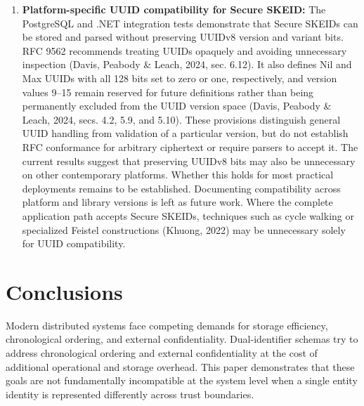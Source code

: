 \documentclass[fleqn,10pt]{wlpeerj}
\begin{document}
\begin{enumerate}
  release, containing algorithms, CDDL definitions, and test vectors.
  Formal IETF submission remains a separate dissemination step.
  Independent implementations in other languages would test the draft's
  interoperability through shared test vectors. Alternative bit
  allocations would require explicit trade-offs among timestamp
  precision, epoch duration, topology capacity, and sequence capacity,
  together with compatibility rules and validation.
\item
  \textbf{Platform-specific UUID compatibility for Secure SKEID:} The
  PostgreSQL and .NET integration tests demonstrate that Secure SKEIDs
  can be stored and parsed without preserving UUIDv8 version and variant
  bits. RFC 9562 recommends treating UUIDs opaquely and avoiding
  unnecessary inspection (Davis, Peabody \& Leach, 2024, sec. 6.12). It
  also defines Nil and Max UUIDs with all 128 bits set to zero or one,
  respectively, and version values 9--15 remain reserved for future
  definitions rather than being permanently excluded from the UUID
  version space (Davis, Peabody \& Leach, 2024, secs. 4.2, 5.9, and
  5.10). These provisions distinguish general UUID handling from
  validation of a particular version, but do not establish RFC
  conformance for arbitrary ciphertext or require parsers to accept it.
  The current results suggest that preserving UUIDv8 bits may also be
  unnecessary on other contemporary platforms. Whether this holds for
  most practical deployments remains to be established. Documenting
  compatibility across platform and library versions is left as future
  work. Where the complete application path accepts Secure SKEIDs,
  techniques such as cycle walking or specialized Feistel constructions
  (Khuong, 2022) may be unnecessary solely for UUID compatibility.
\end{enumerate}

\section{Conclusions}\label{conclusions}

Modern distributed systems face competing demands for storage
efficiency, chronological ordering, and external confidentiality.
Dual-identifier schemas try to address chronological ordering and
external confidentiality at the cost of additional operational and
storage overhead. This paper demonstrates that these goals are not
fundamentally incompatible at the system level when a single entity
identity is represented differently across trust boundaries.
\end{document}

